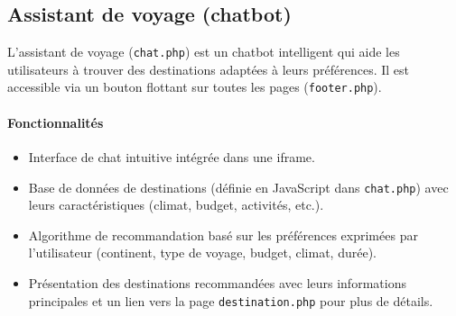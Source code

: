 \documentclass[a4paper,12pt]{article}
\begin{document}
\subsection{Assistant de voyage (chatbot)}

L'assistant de voyage (\texttt{chat.php}) est un chatbot intelligent qui aide les utilisateurs à trouver des destinations adaptées à leurs préférences. Il est accessible via un bouton flottant sur toutes les pages (\texttt{footer.php}).

\paragraph{Fonctionnalités}
\begin{itemize}
  \item Interface de chat intuitive intégrée dans une iframe.
  \item Base de données de destinations (définie en JavaScript dans \texttt{chat.php}) avec leurs caractéristiques (climat, budget, activités, etc.).
  \item Algorithme de recommandation basé sur les préférences exprimées par l'utilisateur (continent, type de voyage, budget, climat, durée).
  \item Présentation des destinations recommandées avec leurs informations principales et un lien vers la page \texttt{destination.php} pour plus de détails.
\end{itemize}
\end{document}
